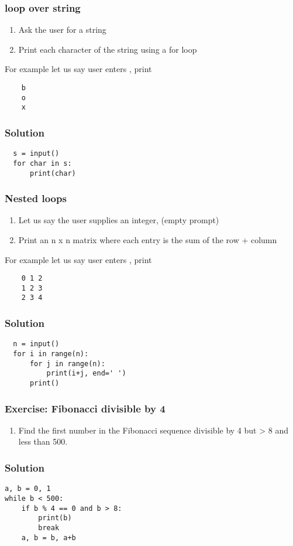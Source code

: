 \documentclass[14pt,compress]{beamer}
\begin{document}
\begin{frame}
  \frametitle{ loop over string}
  \begin{enumerate}
  \item Ask the user for a string
  \item Print each character of the string using a for loop
  \end{enumerate}
  For example let us say user enters , print
  \begin{lstlisting}
    b
    o
    x
  \end{lstlisting}
\end{frame}

\begin{frame}
\frametitle{Solution}
\begin{lstlisting}
  s = input()
  for char in s:
      print(char)
\end{lstlisting}
\end{frame}

\begin{frame}
  \frametitle{Nested  loops}
  \begin{enumerate}
  \item Let us say the user supplies an integer,  (empty prompt)
  \item Print an n x n matrix where each entry is the sum of the row + column
  \end{enumerate}
  For example let us say user enters , print
  \begin{lstlisting}
    0 1 2
    1 2 3
    2 3 4
  \end{lstlisting}
\end{frame}

\begin{frame}
\frametitle{Solution}
\begin{lstlisting}
  n = input()
  for i in range(n):
      for j in range(n):
          print(i+j, end=' ')
      print()
\end{lstlisting}
\end{frame}


\begin{frame}
  \frametitle{Exercise: Fibonacci divisible by 4}
  \begin{enumerate}
  \item Find the first number in the Fibonacci sequence divisible by 4 but > 8
    and less than 500.
  \end{enumerate}
\end{frame}

\begin{frame}
\frametitle{Solution}
\begin{lstlisting}
a, b = 0, 1
while b < 500:
    if b % 4 == 0 and b > 8:
        print(b)
        break
    a, b = b, a+b
\end{lstlisting}
\end{frame}
\end{document}
